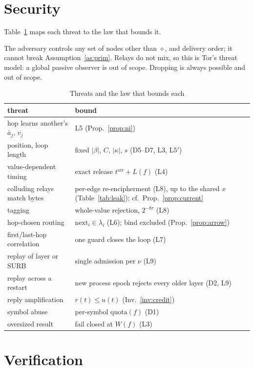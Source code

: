 \documentclass[journal]{IEEEtran}
\newcommand{\cl}{\diamond}
\newcommand{\nxt}{\mathrm{next}}
\newcommand{\quota}{\mathrm{quota}}
\newcommand{\arr}{t^{\mathrm{arr}}}
\begin{document}
\section{Security}\label{sec:security}

Table~\ref{tab:threats} maps each threat to the law that bounds it.

The adversary controls any set of nodes other than $\cl$, and delivery
order; it cannot break Assumption~\ref{as:prim}.  Relays do not mix, so
this is Tor's threat model: a global passive observer is out of scope.  Dropping is always
possible and out of scope.

\begin{table}[t]
\caption{Threats and the law that bounds each}
\label{tab:threats}
\centering\small
\begin{tabular}{@{}>{\raggedright\arraybackslash}p{}>{\raggedright\arraybackslash}p{}@{}}
\toprule
threat & bound \\
\midrule
hop learns another's $\bar a_j$, $v_j$ & L5 (Prop.~\ref{prop:ni}) \\
position, loop length & fixed $|\beta|$, $C$, $|\kappa|$, $s$ (D5--D7, L3, L5$'$) \\
value-dependent timing & exact release $\arr+L(f)$ (L4) \\
colluding relays match bytes & per-edge re-encipherment (L8), up to the shared $x$ (Table~\ref{tab:leak}); cf.\ Prop.~\ref{prop:current} \\
tagging & whole-value rejection, $2^{-8\tau}$ (L8) \\
hop-chosen routing & $\nxt_i\in\lambda_i$ (L6); bind excluded (Prop.~\ref{prop:arrow}) \\
first/last-hop correlation & one guard closes the loop (L7) \\
replay of layer or SURB & single admission per $\nu$ (L9) \\
replay across a restart & new process epoch rejects every older layer (D2, L9) \\
reply amplification & $r(t)\le u(t)$ (Inv.~\ref{inv:credit}) \\
symbol abuse & per-symbol $\quota(f)$ (D1) \\
oversized result & fail closed at $W(f)$ (L3) \\
\bottomrule
\end{tabular}
\end{table}

\section{Verification}\label{sec:verification}
\end{document}
